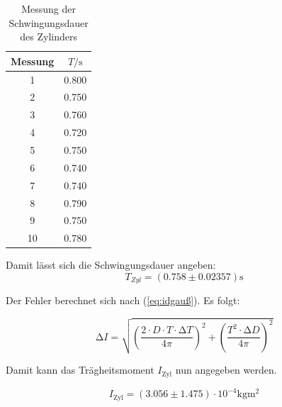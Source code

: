 \begin{table}
  \centering
  \caption{Messung der Schwingungsdauer des Zylinders}
  \label{tab:SchwingungsdauerZylinder}
  \begin{tabular}{c c}
    \toprule
     Messung &  $T / \unit\second$ \\
    \midrule
              1 &        0.800 \\
              2 &        0.750 \\
              3 &        0.760 \\
              4 &        0.720 \\
              5 &        0.750 \\
              6 &        0.740 \\
              7 &        0.740 \\
              8 &        0.790 \\
              9 &        0.750 \\
             10 &        0.780 \\
    \bottomrule
  \end{tabular}
\end{table}

Damit lässt sich die Schwingungsdauer angeben:
\begin{equation*}
  T_{Zyl} = (0.758 \pm 0.02357) \unit{\second}
\end{equation*}


Der Fehler berechnet sich nach (\ref{eq:idgauß}). Es folgt:

\begin{equation} \label{eq:fehler:traeg}
  \increment I = \sqrt{\left( \frac{2 \cdot D \cdot  T \cdot \increment T}{4 \pi} \right)^2 + \left( \frac{T^2 \cdot \increment D}{4 \pi}\right)^2}
\end{equation}


Damit kann das Trägheitsmoment $I_{\text{Zyl}}$ nun angegeben werden.



\begin{equation*}
  I_{\text{Zyl}} = (3.056 \pm 1.475) \cdot 10^{-4} \unit{\kilo\gram\meter\squared}
\end{equation*}


